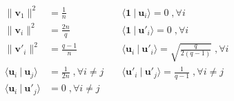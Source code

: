 \begin{align}
\parallel \mathbf{v}_1 \parallel^2 &= \frac{1}{n} & \; & \langle \mathbf{1}  \:|\: \mathbf{u}_i  \rangle = 0 \;,\forall i\nonumber\\
\parallel \mathbf{v}_i \parallel^2 &= \frac{2n}{q} & \; & \langle \mathbf{1} \:|\: \mathbf{u'}_i  \rangle = 0 \;,\forall i \\
\parallel \mathbf{v'}_i \parallel^2 &= \frac{q - 1}{n} & \; & \langle \mathbf{u}_i\:|\: \mathbf{u'}_i  \rangle = \sqrt{\frac{q}{2(q-1)}} \;,\forall i\nonumber\\
 \langle \mathbf{u}_i \:|\: \mathbf{u}_j  \rangle &= \frac{1}{2n} \;,\forall i \neq j & \; & \langle \mathbf{u'}_i \:|\: \mathbf{u'}_j  \rangle = \frac{1}{q - 1} \;,\forall i \neq j \nonumber\\
\langle \mathbf{u}_i \:|\: \mathbf{u'}_j  \rangle &= 0 \;,\forall i \neq j \nonumber\\
\end{align}
